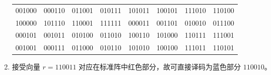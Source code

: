 \documentclass{ctexart}
\begin{document}
\begin{enumerate}
\begin{table}[H]
\begin{tabular}{c|ccccccc}
            001000 & 000110 & 011001 & 010111 & 101011 & 100101 & 111010 & 110100 \\
            100000 & 101110 & 110001 & 111111 & 000011 & 001101 & 010010 & 011100 \\
            000101 & 001011 & 010100 & 011010 & 100110 & 101000 & 110111 & 111001 \\
            001001 & 000111 & 011000 & 010110 & 101010 & 100100 & 111011 & 110101 \\
            \hline
        \end{tabular}
    \end{table}
    \item 接受向量 $r = 110011$ 对应在标准阵中红色部分，故可直接译码为蓝色部分 $110010$。
\end{enumerate}
\end{document}
